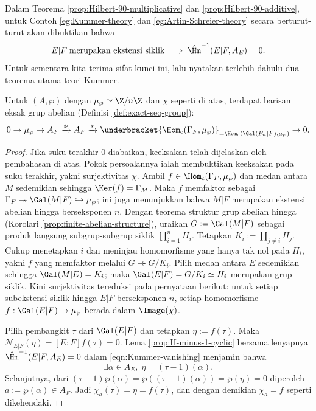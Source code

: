 Dalam Teorema \ref{prop:Hilbert-90-multiplicative} dan \ref{prop:Hilbert-90-additive}, untuk Contoh \ref{eg:Kummer-theory} dan \ref{eg:Artin-Schreier-theory} secara berturut-turut akan dibuktikan bahwa
\begin{equation}\label{eqn:Kummer-vanishing}
	E|F\;\text{merupakan ekstensi siklik} \implies \hat{\Hm}^{-1}(E|F, A_E) = 0.
\end{equation}
Untuk sementara kita terima sifat kunci ini, lalu nyatakan terlebih dahulu dua teorema utama teori Kummer.

\begin{theorem}\label{prop:Kummer-isom}
	Untuk $(A, \wp)$ dengan $\mu_\wp \simeq \Z/n\Z$ dan $\chi$ seperti di atas, terdapat barisan eksak grup abelian (Definisi \ref{def:exact-seq-group}):
	\[ 0 \to \mu_\wp \to A_F \xrightarrow{\wp} A_F \xrightarrow{\chi} \underbracket{\Hom_{\text{c}}(\Gamma_F, \mu_\wp)}_{= \Hom_{\text{c}}\left(\Gal(F_n|F), \mu_\wp \right)} \to 0. \]
\end{theorem}
\begin{proof}
	Jika suku terakhir $0$ diabaikan, keeksakan telah dijelaskan oleh pembahasan di atas. Pokok persoalannya ialah membuktikan keeksakan pada suku terakhir, yakni surjektivitas $\chi$. Ambil $f \in  \Hom_{\text{c}}(\Gamma_F, \mu_\wp)$ dan medan antara $M$ sedemikian sehingga $\Ker(f) = \Gamma_M$. Maka $f$ memfaktor sebagai $\Gamma_F \twoheadrightarrow \Gal(M|F) \hookrightarrow \mu_\wp$; ini juga menunjukkan bahwa $M|F$ merupakan ekstensi abelian hingga berseksponen $n$. Dengan teorema struktur grup abelian hingga (Korolari \ref{prop:finite-abelian-structure}), uraikan $G := \Gal(M|F)$ sebagai produk langsung subgrup-subgrup siklik $\prod_{i=1}^n H_i$. Tetapkan $K_i := \prod_{j \neq i} H_j$. Cukup menetapkan $i$ dan meninjau homomorfisme yang hanya tak nol pada $H_i$, yakni $f$ yang memfaktor melalui $G \twoheadrightarrow G/K_i$. Pilih medan antara $E$ sedemikian sehingga $\Gal(M|E) = K_i$; maka $\Gal(E|F) = G/K_i \simeq H_i$ merupakan grup siklik. Kini surjektivitas tereduksi pada pernyataan berikut: untuk setiap subekstensi siklik hingga $E|F$ berseksponen $n$, setiap homomorfisme $f: \Gal(E|F) \to \mu_\wp$ berada dalam $\Image(\chi)$.
	
	Pilih pembangkit $\tau$ dari $\Gal(E|F)$ dan tetapkan $\eta := f(\tau)$. Maka $\mathcal{N}_{E|F}(\eta) = [E:F]f(\tau) = 0$. Lema \ref{prop:H-minus-1-cyclic} bersama lenyapnya $\hat{\Hm}^{-1}(E|F, A_E) = 0$ dalam \eqref{eqn:Kummer-vanishing} menjamin bahwa
	\[ \exists \alpha \in A_E, \; \eta = \left(\tau - 1 \right)(\alpha). \]
	Selanjutnya, dari $(\tau-1) \wp(\alpha) = \wp((\tau-1)(\alpha)) = \wp(\eta) = 0$ diperoleh $a := \wp(\alpha) \in A_F$. Jadi $\chi_a(\tau) = \eta = f(\tau)$, dan dengan demikian $\chi_a = f$ seperti dikehendaki.
\end{proof}

